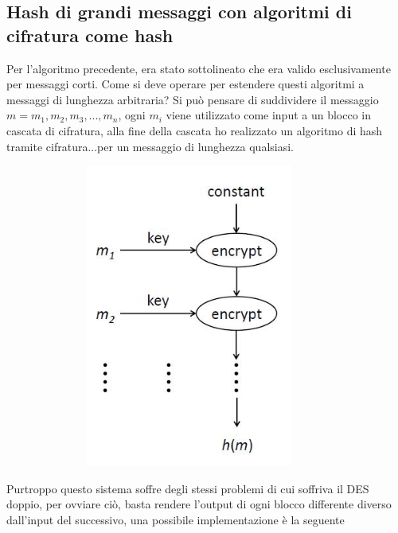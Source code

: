 \subsection{Hash di grandi messaggi con algoritmi di cifratura come hash}
Per l'algoritmo precedente, era stato sottolineato che era valido esclusivamente per messaggi corti.
Come si deve operare per estendere questi algoritmi a messaggi di lunghezza arbitraria?
Si può pensare di suddividere il messaggio $m = m_{1},m_{2},m_{3},...,m_{n}$, ogni $m_{i}$ viene utilizzato come input a un blocco in cascata di cifratura, alla fine della cascata ho realizzato un algoritmo di hash tramite cifratura...per un messaggio di lunghezza qualsiasi.\\
\begin{figure}
	\begin{center}
	{\includegraphics[height=10cm, width=10cm, keepaspectratio]{Immagini/Capitolo4/schema_des_come_hash_1.JPG}}
	\end{center}
\end{figure}
Purtroppo questo sistema soffre degli stessi problemi di cui soffriva il DES doppio, per ovviare ciò, basta rendere l'output di ogni blocco differente diverso dall'input del successivo, una possibile implementazione è la seguente
